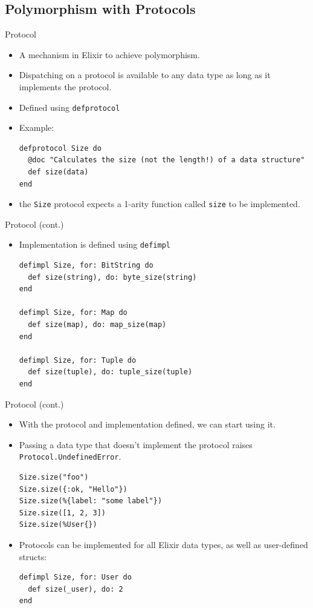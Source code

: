 \documentclass[12pt]{beamer}
\begin{document}
\subsection{Polymorphism with Protocols}
\begin{frame}[fragile]{Protocol}
  \begin{itemize}
    \item A mechanism in Elixir to achieve polymorphism.
    \item Dispatching on a protocol is available to any data type as long as it implements the protocol.
    \item Defined using \texttt{defprotocol}
    \item Example:
          \begin{verbatim}
defprotocol Size do
  @doc "Calculates the size (not the length!) of a data structure"
  def size(data)
end
  \end{verbatim}
    \item the \texttt{Size} protocol expects a 1-arity function called \texttt{size} to be implemented.
  \end{itemize}
\end{frame}

\begin{frame}[fragile]{Protocol (cont.)}
  \begin{itemize}
    \item Implementation is defined using \texttt{defimpl}
          \begin{verbatim}
defimpl Size, for: BitString do
  def size(string), do: byte_size(string)
end

defimpl Size, for: Map do
  def size(map), do: map_size(map)
end

defimpl Size, for: Tuple do
  def size(tuple), do: tuple_size(tuple)
end
  \end{verbatim}
  \end{itemize}
\end{frame}

\begin{frame}[fragile]{Protocol (cont.)}
  \begin{itemize}
    \item With the protocol and implementation defined, we can start using it.
    \item Passing a data type that doesn't implement the protocol raises \texttt{Protocol.UndefinedError}.
          \begin{verbatim}
Size.size("foo")
Size.size({:ok, "Hello"})
Size.size(%{label: "some label"})
Size.size([1, 2, 3])
Size.size(%User{})
  \end{verbatim}
    \item Protocols can be implemented for all Elixir data types, as well as user-defined structs:
          \begin{verbatim}
defimpl Size, for: User do
  def size(_user), do: 2
end
  \end{verbatim}
  \end{itemize}
\end{frame}
\end{document}
